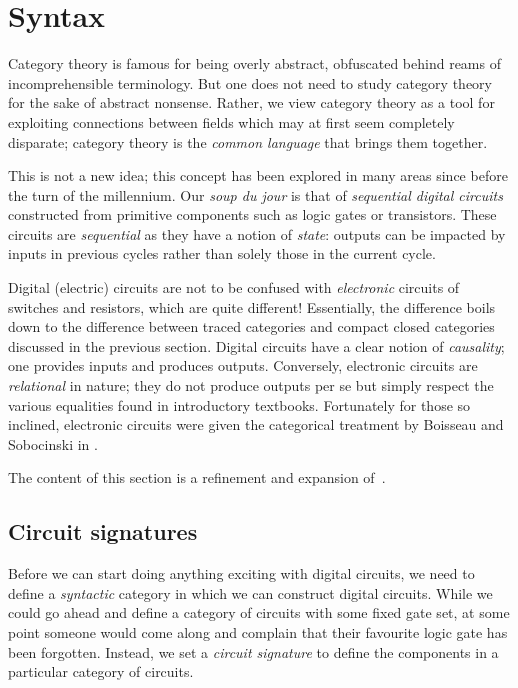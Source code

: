 \chapter{Syntax}

Category theory is famous for being overly abstract, obfuscated
behind reams of incomprehensible terminology.
But one does not need to study category theory for the sake of abstract
nonsense.
Rather, we view category theory as a tool for exploiting connections
between fields which may at first seem completely disparate; category theory is
the \emph{common language} that brings them together.

This is not a new idea; this concept has been explored in many areas since
before the turn of the millennium.
Our \emph{soup du jour} is that of \emph{sequential digital circuits}
constructed from primitive components such as logic gates or transistors.
These circuits are \emph{sequential} as they have a notion of \emph{state}:
outputs can be impacted by inputs in previous cycles rather than solely those in
the current cycle.

\begin{remark}
    Digital (electric) circuits are not to be confused with \emph{electronic}
    circuits of switches and resistors, which are quite different!
    Essentially, the difference boils down to the difference between traced
    categories and compact closed categories discussed in the previous section.
    Digital circuits have a clear notion of \emph{causality}; one provides
    inputs and produces outputs.
    Conversely, electronic circuits are \emph{relational} in nature; they do not
    produce outputs per se but simply respect the various equalities found in
    introductory textbooks.
    Fortunately for those so inclined, electronic circuits were given the
    categorical treatment by Boisseau and Sobocinski in
    \cite{boisseau2022string}.
\end{remark}

\begin{remark}
    The content of this section is a refinement and expansion
    of~\cite[Section 2]{ghica2023compositional}.
\end{remark}

\section{Circuit signatures}

Before we can start doing anything exciting with digital circuits, we need to
define a \emph{syntactic} category in which we can construct digital circuits.
While we could go ahead and define a category of circuits with some fixed gate
set, at some point someone would come along and complain that their favourite
logic gate has been forgotten.
Instead, we set a \emph{circuit signature} to define the components in a
particular category of circuits.

